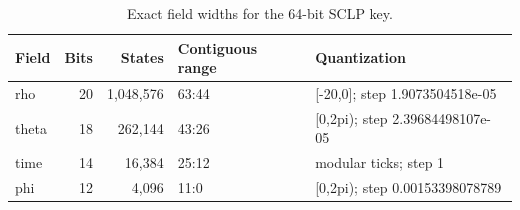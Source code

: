 \begin{table}[H]
\centering
\small
\begin{tabularx}{0.96\textwidth}{lrrlX}
\toprule
\textbf{Field} & \textbf{Bits} & \textbf{States} & \textbf{Contiguous range} & \textbf{Quantization}\\
\midrule
rho & 20 & 1,048,576 & 63:44 & [-20,0]; step 1.9073504518e-05\\
theta & 18 & 262,144 & 43:26 & [0,2pi); step 2.39684498107e-05\\
time & 14 & 16,384 & 25:12 & modular ticks; step 1\\
phi & 12 & 4,096 & 11:0 & [0,2pi); step 0.00153398078789\\
\bottomrule
\end{tabularx}
\caption{Exact field widths for the 64-bit SCLP key.}
\end{table}
